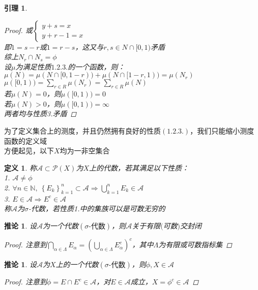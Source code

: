 \documentclass[12pt, a4paper, oneside]{ctexbook}
\newtheorem{definition}[theorem]{定义}
\newtheorem{lemma}[theorem]{引理}
\newtheorem{corollary}[theorem]{推论}
\begin{document}
\begin{lemma}
\begin{proof}
        或$\left\{\begin{matrix}
            y+s=x\\
           y+r-1=x
           \end{matrix}\right.$\\
        即$1=s-r$或$1=r-s$，这又与$r,s\in N\cap [0,1)$矛盾\\
        综上$N_r\cap N_s=\phi$\\
        设$\mu$为满足性质$1.2.3.$的一个函数，则：\\
        $\mu(N)=\mu(N\cap [0,1-r))+\mu(N\cap [1-r,1))=\mu(N_r)$\\
        $\mu([0,1))=\sum_{r\in R}\mu(N_r)=\sum_{r\in R}\mu(N)$\\
        若$\mu(N)=0$，则$\mu([0,1))=0$\\
        若$\mu(N)>0$，则$\mu([0,1))=\infty$\\
        两者均与性质3.矛盾
    \end{proof}
\end{lemma}
为了定义集合上的测度，并且仍然拥有良好的性质$(1.2.3.)$，我们只能缩小测度函数的定义域\\
方便起见，以下$X$均为一非空集合
\begin{definition}
    称$\mathcal{A}\subset\mathcal{P}(X)$为$X$上的代数，若其满足以下性质：\\
    1. $\mathcal{A}\neq\phi$\\
    2. $\forall n\in\mathbb{N},\ \left\{E_k\right\}_{k=1}^n\subset\mathcal{A}\Rightarrow \bigcup_{k=1}^{n}E_k\in\mathcal{A}$\\
    3. $E\in\mathcal{A}\Rightarrow E^c\in\mathcal{A}$\\
    称$\mathcal{A}$为$\sigma$-代数，若性质1.中的集族可以是可数无穷的
\end{definition}
\begin{corollary}
    设$\mathcal{A}$为一个代数$(\sigma\text{-代数})$，则$\mathcal{A}$关于有限$($可数$)$交封闭
    \begin{proof}
        注意到$\bigcap_{\alpha\in \Lambda }E_{\alpha}=(\bigcup_{\alpha\in\Lambda}E_{\alpha}^c)^c$，其中$\Lambda$为有限或可数指标集
    \end{proof}
\end{corollary}
\begin{corollary}
    设$\mathcal{A}$为$X$上的一个代数$(\sigma\text{-代数})$，则$\phi,X\in\mathcal{A}$
    \begin{proof}
        注意到$\phi=E\cap E^c\in\mathcal{A}$，对$E\in\mathcal{A}$成立，$X=\phi^c\in\mathcal{A}$
    \end{proof}
\end{corollary}
\end{document}
